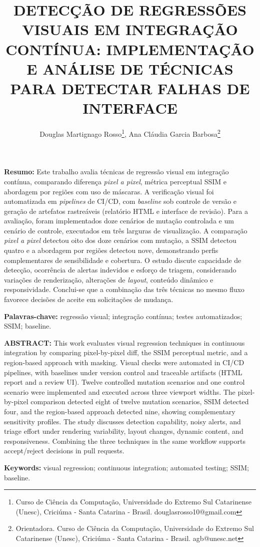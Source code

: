 \documentclass{UNESC}
\title{DETECÇÃO DE REGRESSÕES VISUAIS EM INTEGRAÇÃO CONTÍNUA: IMPLEMENTAÇÃO E ANÁLISE DE TÉCNICAS PARA DETECTAR FALHAS DE INTERFACE}
\author
{
   Douglas Martignago Rosso\footnote{Curso de Ciência da Computação, Universidade do Extremo Sul Catarinense (Unesc), Criciúma - Santa Catarina - Brasil. douglasrosso10@gmail.com},
   Ana Cláudia Garcia Barbosa\footnote{Orientadora. Curso de Ciência da Computação, Universidade do Extremo Sul Catarinense (Unesc), Criciúma - Santa Catarina - Brasil. agb@unesc.net}
}
\begin{document}
\onehalfspacing

\maketitle

\noindent
\textbf{Resumo:} Este trabalho avalia técnicas de regressão visual em integração contínua, comparando diferença \emph{pixel a pixel}, métrica perceptual SSIM e abordagem por regiões com uso de máscaras. A verificação visual foi automatizada em \emph{pipelines} de CI/CD, com \emph{baseline} sob controle de versão e geração de artefatos rastreáveis (relatório HTML e interface de revisão). Para a avaliação, foram implementados doze cenários de mutação controlada e um cenário de controle, executados em três larguras de visualização. A comparação \emph{pixel a pixel} detectou oito dos doze cenários com mutação, a SSIM detectou quatro e a abordagem por regiões detectou nove, demonstrando perfis complementares de sensibilidade e cobertura. O estudo discute capacidade de detecção, ocorrência de alertas indevidos e esforço de triagem, considerando variações de renderização, alterações de \emph{layout}, conteúdo dinâmico e responsividade. Conclui-se que a combinação das três técnicas no mesmo fluxo favorece decisões de aceite em solicitações de mudança.

\vspace{0.5em}
\noindent
\textbf{Palavras-chave:} regressão visual; integração contínua; testes automatizados; SSIM; baseline.

\vspace{1.0em}
\noindent
\textbf{ABSTRACT:} This work evaluates visual regression techniques in continuous integration by comparing pixel-by-pixel diff, the SSIM perceptual metric, and a region-based approach with masking. Visual checks were automated in CI/CD pipelines, with baselines under version control and traceable artifacts (HTML report and a review UI). Twelve controlled mutation scenarios and one control scenario were implemented and executed across three viewport widths. The pixel-by-pixel comparison detected eight of twelve mutation scenarios, SSIM detected four, and the region-based approach detected nine, showing complementary sensitivity profiles. The study discusses detection capability, noisy alerts, and triage effort under rendering variability, layout changes, dynamic content, and responsiveness. Combining the three techniques in the same workflow supports accept/reject decisions in pull requests.

\vspace{0.5em}
\noindent
\textbf{Keywords:} visual regression; continuous integration; automated testing; SSIM; baseline.
\end{document}
